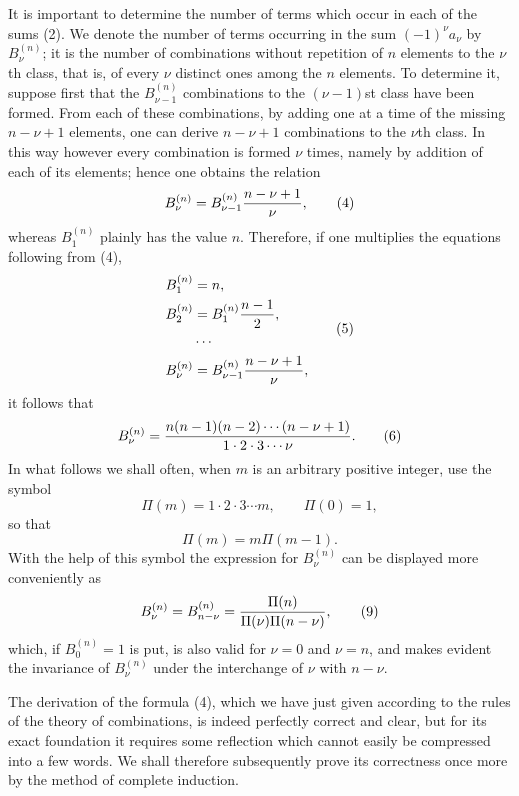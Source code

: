 \documentclass[11pt]{article}
\begin{document}
It is important to determine the number of terms which occur in each of the sums (2). We denote the number of terms occurring in the sum $(-1)^\nu a_\nu$ by $B_\nu^{(n)}$; it is the number of combinations without repetition of $n$ elements to the $\nu$th class, that is, of every $\nu$ distinct ones among the $n$ elements. To determine it, suppose first that the $B_{\nu-1}^{(n)}$ combinations to the $(\nu-1)$st class have been formed. From each of these combinations, by adding one at a time of the missing $n-\nu+1$ elements, one can derive $n-\nu+1$ combinations to the $\nu$th class. In this way however every combination is formed $\nu$ times, namely by addition of each of its elements; hence one obtains the relation
\begin{equation}
 B_\nu^{(n)}=B_{\nu-1}^{(n)}{n-\nu+1\over \nu},
\tag{4}
\end{equation}
whereas $B_1^{(n)}$ plainly has the value $n$. Therefore, if one multiplies the equations following from (4),
\begin{equation}
\begin{aligned}
 B_1^{(n)}&=n,\\
 B_2^{(n)}&=B_1^{(n)}{n-1\over 2},\\
&\cdots\\
 B_\nu^{(n)}&=B_{\nu-1}^{(n)}{n-\nu+1\over \nu},
\end{aligned}
\tag{5}
\end{equation}
it follows that
\begin{equation}
 B_\nu^{(n)}={n(n-1)(n-2)\cdots(n-\nu+1)\over 1\cdot2\cdot3\cdots\nu}.
\tag{6}
\end{equation}
In what follows we shall often, when $m$ is an arbitrary positive integer, use the symbol
\begin{equation}
 \Pi(m)=1\cdot2\cdot3\cdots m,
 \qquad
 \Pi(0)=1,
\tag{7}
\end{equation}
so that
\begin{equation}
 \Pi(m)=m\Pi(m-1).
\tag{8}
\end{equation}
With the help of this symbol the expression for $B_\nu^{(n)}$ can be displayed more conveniently as
\begin{equation}
 B_\nu^{(n)}=B_{n-\nu}^{(n)}={\Pi(n)\over \Pi(\nu)\Pi(n-\nu)},
\tag{9}
\end{equation}
which, if $B_0^{(n)}=1$ is put, is also valid for $\nu=0$ and $\nu=n$, and makes evident the invariance of $B_\nu^{(n)}$ under the interchange of $\nu$ with $n-\nu$.

The derivation of the formula (4), which we have just given according to the rules of the theory of combinations, is indeed perfectly correct and clear, but for its exact foundation it requires some reflection which cannot easily be compressed into a few words. We shall therefore subsequently prove its correctness once more by the method of complete induction.
\end{document}
